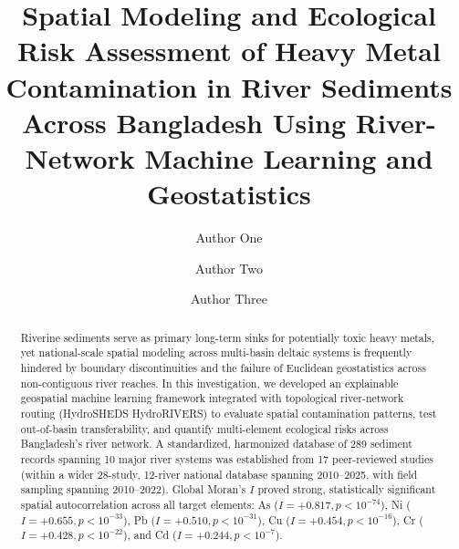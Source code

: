 \documentclass[authoryear,preprint,12pt]{elsarticle}
\begin{document}
\begin{frontmatter}

\title{Spatial Modeling and Ecological Risk Assessment of Heavy Metal Contamination in River Sediments Across Bangladesh Using River-Network Machine Learning and Geostatistics}

\author[inst1]{Author One}
\author[inst1,inst2]{Author Two}
\author[inst2]{Author Three}




\begin{abstract}
Riverine sediments serve as primary long-term sinks for potentially toxic heavy metals, yet national-scale spatial modeling across multi-basin deltaic systems is frequently hindered by boundary discontinuities and the failure of Euclidean geostatistics across non-contiguous river reaches. In this investigation, we developed an explainable geospatial machine learning framework integrated with topological river-network routing (HydroSHEDS HydroRIVERS) to evaluate spatial contamination patterns, test out-of-basin transferability, and quantify multi-element ecological risks across Bangladesh's river network. A standardized, harmonized database of 289 sediment records spanning 10 major river systems was established from 17 peer-reviewed studies (within a wider 28-study, 12-river national database spanning 2010--2025, with field sampling spanning 2010--2022). Global Moran's $I$ proved strong, statistically significant spatial autocorrelation across all target elements: As ($I=+0.817, p < 10^{-74}$), Ni ($I=+0.655, p < 10^{-33}$), Pb ($I=+0.510, p < 10^{-31}$), Cu ($I=+0.454, p < 10^{-16}$), Cr ($I=+0.428, p < 10^{-22}$), and Cd ($I=+0.244, p < 10^{-7}$). 


\end{abstract}
\end{frontmatter}
\end{document}

